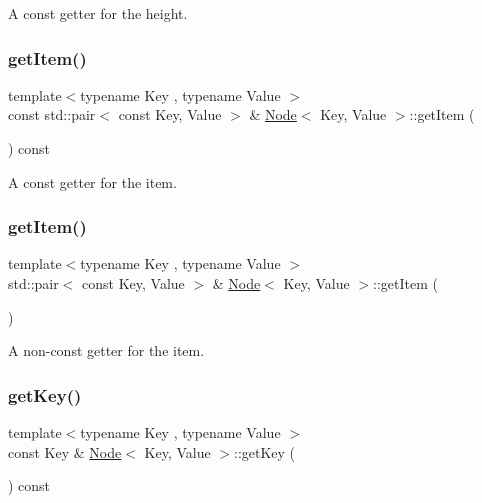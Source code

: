 A const getter for the height. \mbox{\label{classNode_a41e3bd64767b0a5ed30c6f9d8d6b3ead}} 
\subsubsection{\texorpdfstring{get\+Item()}{getItem()}\hspace{0.1cm}{\footnotesize\ttfamily [1/2]}}
{\footnotesize\ttfamily template$<$typename Key , typename Value $>$ \\
const std\+::pair$<$ const Key, Value $>$ \& \mbox{\hyperlink{classNode}{Node}}$<$ Key, Value $>$\+::get\+Item (\begin{DoxyParamCaption}{ }\end{DoxyParamCaption}) const}

A const getter for the item. \mbox{\label{classNode_a4e683e6ac10c3015939f9598bb2c2629}} 
\subsubsection{\texorpdfstring{get\+Item()}{getItem()}\hspace{0.1cm}{\footnotesize\ttfamily [2/2]}}
{\footnotesize\ttfamily template$<$typename Key , typename Value $>$ \\
std\+::pair$<$ const Key, Value $>$ \& \mbox{\hyperlink{classNode}{Node}}$<$ Key, Value $>$\+::get\+Item (\begin{DoxyParamCaption}{ }\end{DoxyParamCaption})}

A non-\/const getter for the item. \mbox{\label{classNode_a9ad1feabf07e276143802749d48a5736}} 
\subsubsection{\texorpdfstring{get\+Key()}{getKey()}}
{\footnotesize\ttfamily template$<$typename Key , typename Value $>$ \\
const Key \& \mbox{\hyperlink{classNode}{Node}}$<$ Key, Value $>$\+::get\+Key (\begin{DoxyParamCaption}{ }\end{DoxyParamCaption}) const}


